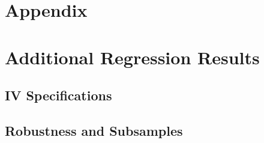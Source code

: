 \clearpage
\appendix

\section*{Appendix}
{}



\renewcommand{\thetable}{\Alph{section}\arabic{table}}
\renewcommand{\thefigure}{\Alph{section}\arabic{figure}}


\section{Additional Regression Results}

\subsection{IV Specifications}

\label{tab:A2_iv_nolag}



\newpage
{}
\label{tab:A3_iv_lag1}



\newpage
{}
\label{tab:A4_dyn_2sls}



\subsection{Robustness and Subsamples}
\label{tab:A7_iv_lag1_frontier_strict}



\newpage
{}
\label{tab:A8_dyn_2sls_frontier_strict}




